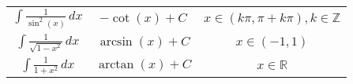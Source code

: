 \begin{minipage}{\linewidth}
\begin{tabular}{|c|c|c|}
        \(\displaystyle\int \frac{1}{\sin^2(x)} \,dx\)    & \(-\cot(x) + C\)                                   & \(x\in\left( k\pi, \pi + k\pi \right), k\in\mathbb{Z}\)                            \\
        \(\displaystyle\int \frac{1}{\sqrt{1-x^2}} \,dx\) & \(\arcsin(x) + C\)                                 & \(x\in(-1,1)\)                                                                     \\
        \(\displaystyle\int \frac{1}{1+x^2} \,dx\)        & \(\arctan(x) + C\)                                 & \(x\in\mathds{R}\)                                                                 \\
        \hline
    \end{tabular}

\end{minipage}
